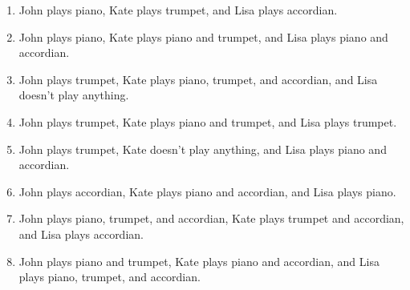 \documentclass[12pt, letterpaper]{report}
\begin{document}
\begin{enumerate}
\begin{enumerate}
\item John plays piano, Kate plays trumpet, and Lisa plays accordian.
\item John plays piano, Kate plays piano and trumpet, and Lisa plays piano and accordian.
\item John plays trumpet, Kate plays piano, trumpet, and accordian, and Lisa doesn't play anything.
\item John plays trumpet, Kate plays piano and trumpet, and Lisa plays trumpet.
\item John plays trumpet, Kate doesn't play anything, and Lisa plays piano and accordian.
\item John plays accordian, Kate plays piano and accordian, and Lisa plays piano.
\item John plays piano, trumpet, and accordian, Kate plays trumpet and accordian, and Lisa plays accordian.
\item John plays piano and trumpet, Kate plays piano and accordian, and Lisa plays piano, trumpet, and accordian.
\end{enumerate}

\end{enumerate}
\end{document}
